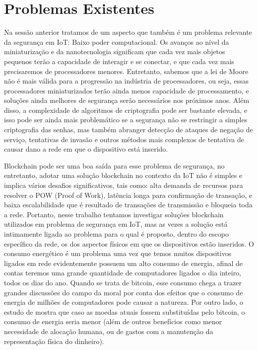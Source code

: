 \section{Problemas Existentes}

Na sessão anterior tratamos de um aspecto que também é um problema relevante da segurança em IoT: Baixo poder computacional. Os avanços ao nível da miniaturização e da nanotecnologia significam que cada vez mais objetos pequenos terão a capacidade de interagir e se conectar, e que cada vez mais precisaremos de processadores menores. Entretanto, sabemos que a lei de Moore não é mais válida para a progressão na indústria de processadores, ou seja, essas processadores miniaturizados terão ainda menos capacidade de processamento, e soluções ainda melhores de segurança serão necessários nos próximos anos. Além disso, a complexidade de algoritmos de criptografia pode ser bastante elevada, e isso pode ser ainda mais problemático se a segurança não se restringir a simples criptografia das senhas, mas também abranger detecção de ataques de negação de serviço, tentativas de invasão e outros métodos mais complexos de tentativa de causar dano a rede em que o dispositivo está inserido.

Blockchain pode ser uma boa saída para esse problema de segurança, no entretanto, adotar uma solução blockchain no contexto da IoT não é simples e implica vários desafios significativos, tais como: alta demanda de recursos para resolver o POW (Proof of Work), latência longa para confirmação de transação, e baixa escalabilidade que é resultado de transações de transmissão e bloqueia toda a rede. Portanto, nesse trabalho tentamos investigar soluções blockchain utilizados em problema de segurança em IoT, mas as vezes a solução está intimamente ligada ao problema para o qual é proposto, dentro do escopo específico da rede, os dos aspectos físicos em que os dispositivos estão inseridos. O consumo energético é um problema uma vez que temos muitos dispositivos ligados em rede evidentemente possuem um alto consumo de energia, afinal de contas teremos uma grande quantidade de computadores ligados o dia inteiro, todos os dias do ano. Quando se trata de bitcoin, esse consumo chega a trazer grandes discussões do campo da moral por conta dos efeitos que o consumo de energia de milhões de computadores pode causar a natureza. Por outro lado, o estudo de \cite{mccook2014order} mostra que caso as moedas atuais fossem substituídas pelo bitcoin, o consumo de energia seria menor (além de outros benefícios como menor necessidade de alocação humana, ou de gastos com a manutenção da representação física do dinheiro).

